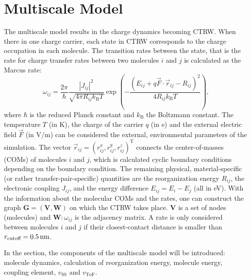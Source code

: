 \documentclass[letterpaper,12pt]{article}
\begin{document}
\section{Multiscale Model}
The multiscale model results in the charge dynamics becoming CTRW. When there in one charge carrier, each state in CTRW corresponds to the charge occupation in each molecule. The transition rates between the state, that is the rate for charge transfer rates between two molecules $i$ and $j$ is calculated as the Marcus rate:
%
\begin{equation}
    \omega_{ij} = \frac{2\pi}{\hbar} \frac{|J_{ij}|^2}{\sqrt{4\pi R_{ij} k_\text{B}T}} \exp\left(-\frac{(E_{ij} + q \vec{F} \cdot \vec{r}_{ij} - R_{ij})^2}{4R_{ij} k_\text{B}T}\right) ,
    \label{equ:Marcus}
\end{equation}
%
where $\hbar$ is the reduced Planck constant and $k_\text{B}$ the Boltzmann constant. The temperature $T$ (in \unit[]{K}), the charge of the carrier $q$ (in \unit[]{e}) and the external electric field $\vec{F}$ (in V/m) can be considered the external, environmental parameters of the simulation. The vector $\vec{r}_{ij} = (r^x_{ij},r^y_{ij},r^z_{ij})^\text{T}$ connects the center-of-masses (COMs) of molecules $i$ and $j$, which is calculated cyclic boundary conditions depending on the boundary condition. The remaining physical, material-specific (or rather transfer-pair-specific) quantities are the reorganization energy $R_{ij}$, the electronic coupling $J_{ij}$, and the energy difference $E_{ij} = E_i - E_j$ (all in \unit[]{eV}). With the information about the molecular COMs and the rates, one can construct the graph $\mathbf{G}=(\mathbf{V}, \mathbf{W})$ on which the CTRW takes place. $\mathbf{V}$ is a set of nodes (molecules) and $\mathbf{W}: \omega_{ij}$ is the adjacency matrix. A rate is only considered between molecules $i$ and $j$ if their closest-contact distance is smaller than $r_\text{cutoff}=\unit[0.5]{nm}$.

In the section, the components of the multiscale model will be introduced: molecule dynamics, calculation of reorganization energy, molecule energy, coupling element, $v_\text{SS}$ and $v_\text{ToF}$.

\end{document}
